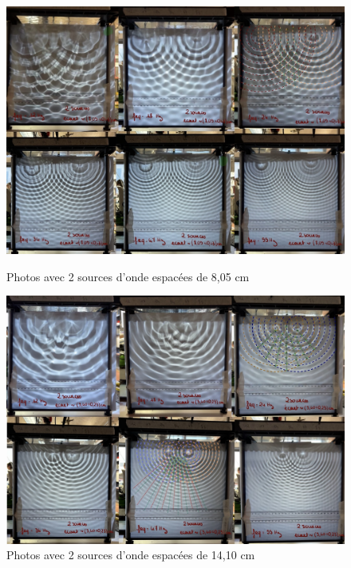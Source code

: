 \documentclass{report}
\begin{document}
\begin{figure}[H]
\centering
\begin{minipage}{0.45\textwidth}
  \centering
  \includegraphics[scale=0.14]{S2M.jpg}
  \caption{Photos avec 2 sources d'onde espacées de 8,05 cm}
  \label{fig:s1}
\end{minipage}\hfill
\begin{minipage}{0.45\textwidth}
  \centering
  \includegraphics[scale=0.12]{S2P.jpg}
  \caption{Photos avec 2 sources d'onde espacées de 14,10 cm}
  \label{fig:s2}
\end{minipage}
\end{figure}
\end{document}

